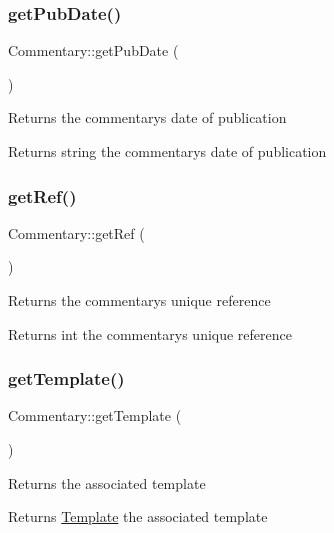\subsubsection{\texorpdfstring{get\+Pub\+Date()}{getPubDate()}}
{\footnotesize\ttfamily Commentary\+::get\+Pub\+Date (\begin{DoxyParamCaption}{ }\end{DoxyParamCaption})}

Returns the commentary\textquotesingle{}s date of publication \begin{DoxyReturn}{Returns}
string the commentary\textquotesingle{}s date of publication 
\end{DoxyReturn}
\mbox{\label{classCommentary_a49fd28fb104f1eb823c7caf0dbfb1604}} 
\subsubsection{\texorpdfstring{get\+Ref()}{getRef()}}
{\footnotesize\ttfamily Commentary\+::get\+Ref (\begin{DoxyParamCaption}{ }\end{DoxyParamCaption})}

Returns the commentary\textquotesingle{}s unique reference \begin{DoxyReturn}{Returns}
int the commentary\textquotesingle{}s unique reference 
\end{DoxyReturn}
\mbox{\label{classCommentary_a32de49a162042abf5565476fca4ab4ad}} 
\subsubsection{\texorpdfstring{get\+Template()}{getTemplate()}}
{\footnotesize\ttfamily Commentary\+::get\+Template (\begin{DoxyParamCaption}{ }\end{DoxyParamCaption})}

Returns the associated template \begin{DoxyReturn}{Returns}
\hyperlink{classTemplate}{Template} the associated template 
\end{DoxyReturn}
\mbox{\label{classCommentary_aa54990942879c76342e6ef8a1d78929d}} 

